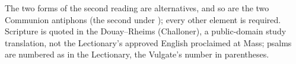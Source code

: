\vspace{0.2em}
{\footnotesize\noindent The two forms of the second reading are alternatives,
and so are the two Communion antiphons (the second under ); every
other element is required. Scripture is quoted in the Douay--Rheims
(Challoner), a public-domain study translation, not the Lectionary's approved
English proclaimed at Mass; psalms are numbered as in the Lectionary, the
Vulgate's number in parentheses.\par}
